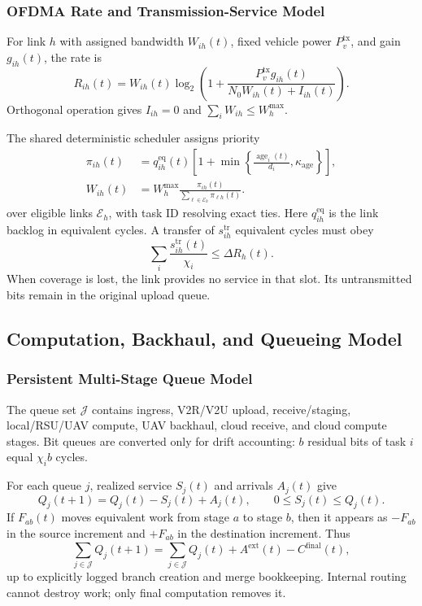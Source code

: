 \subsubsection{OFDMA Rate and Transmission-Service Model}
For link $h$ with assigned bandwidth $W_{ih}(t)$, fixed vehicle power
$P_v^{\mathrm{tx}}$, and gain $g_{ih}(t)$, the rate is
\begin{equation}
R_{ih}(t)=W_{ih}(t)\log_2\!\left(
1+\frac{P_v^{\mathrm{tx}}g_{ih}(t)}
{N_0W_{ih}(t)+I_{ih}(t)}\right).
\label{eq:rate}
\end{equation}
Orthogonal operation gives $I_{ih}=0$ and
$\sum_iW_{ih}\le W_h^{\max}$.

The shared deterministic scheduler assigns priority
\begin{equation}
\begin{aligned}
\pi_{ih}(t)&=q_{ih}^{\mathrm{eq}}(t)
\left[1+\min\left\{\frac{\operatorname{age}_i(t)}{d_i},
\kappa_{\mathrm{age}}\right\}\right],\\
W_{ih}(t)&=W_h^{\max}
\frac{\pi_{ih}(t)}{\sum_{\ell\in\mathcal E_h}\pi_{\ell h}(t)}.
\end{aligned}
\label{eq:ofdma}
\end{equation}
over eligible links $\mathcal E_h$, with task ID resolving exact ties.
Here $q_{ih}^{\mathrm{eq}}$ is the link backlog in equivalent cycles.
A transfer of $s_{ih}^{\mathrm{tr}}$ equivalent cycles must obey
\begin{equation}
\sum_i\frac{s_{ih}^{\mathrm{tr}}(t)}{\chi_i}
\le\Delta R_h(t).
\label{eq:radio_capacity}
\end{equation}
When coverage is lost, the link provides no service in that slot. Its
untransmitted bits remain in the original upload queue.

\subsection{Computation, Backhaul, and Queueing Model}
\subsubsection{Persistent Multi-Stage Queue Model}
The queue set $\mathcal J$ contains ingress, V2R/V2U upload,
receive/staging, local/RSU/UAV compute, UAV backhaul, cloud receive,
and cloud compute stages. Bit queues are converted only for drift
accounting: $b$ residual bits of task $i$ equal $\chi_i b$ cycles.

For each queue $j$, realized service $S_j(t)$ and arrivals $A_j(t)$ give
\begin{equation}
Q_j(t+1)=Q_j(t)-S_j(t)+A_j(t),\qquad
0\le S_j(t)\le Q_j(t).
\label{eq:queue}
\end{equation}
If $F_{ab}(t)$ moves equivalent work from stage $a$ to stage $b$,
then it appears as $-F_{ab}$ in the source increment and $+F_{ab}$ in
the destination increment. Thus
\begin{equation}
\sum_{j\in\mathcal J}Q_j(t+1)=
\sum_{j\in\mathcal J}Q_j(t)+A^{\mathrm{ext}}(t)-C^{\mathrm{final}}(t),
\label{eq:conservation}
\end{equation}
up to explicitly logged branch creation and merge bookkeeping.
Internal routing cannot destroy work; only final computation removes it.

